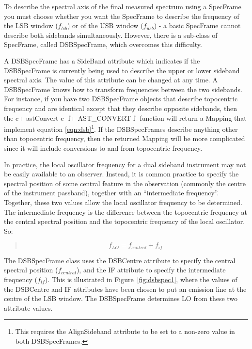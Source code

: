 \documentclass[twoside,11pt]{starlink}
\begin{document}
To describe the spectral axis of the final measured spectrum
using a SpecFrame you must choose whether you want the SpecFrame to
describe the frequency of the LSB window ($f_{lsb}$) or of the USB window
($f_{usb}$) - a basic SpecFrame cannot describe both sidebands
simultaneously. However, there is a sub-class of SpecFrame, called
DSBSpecFrame, which overcomes this difficulty.

A DSBSpecFrame has a SideBand attribute which indicates if the
DSBSpecFrame is currently being used to describe the upper or lower
sideband spectral axis. The value of this attribute can be changed at any
time. A DSBSpecFrame knows how to transform frequencies between the two
sidebands. For instance, if you have two DSBSpecFrame objects that
describe topocentric frequency and are identical except that they
describe opposite sidebands, then the
c+
astConvert
c-
f+
AST\_CONVERT
f-
function will return a Mapping that implement equation
\ref{eqn:dsb}\footnote{This requires the AlignSideband attribute to be
set to a non-zero value in both DSBSpecFrames.}. If the DSBSpecFrames
describe anything other than topocentric frequency, then the returned
Mapping will be more complicated since it will include conversions to and
from topocentric frequency.

In practice, the local oscillator frequency for a dual sideband
instrument may not be easily available to an observer. Instead, it is
common practice to specify the spectral position of some central feature
in the observation (commonly the centre of the instrument passband),
together with an ``intermediate frequency''. Together, these two values
allow the local oscillator frequency to be determined. The intermediate
frequency is the difference between the topocentric frequency at the
central spectral position and the topocentric frequency of the local
oscillator. So:

\begin{quote}
\begin{small}
\begin{equation}
\label{eqn:dsb2}
   f_{LO} = f_{central} + f_{if}
\end{equation}
\end{small}
\end{quote}

The DSBSpecFrame class uses the DSBCentre attribute to specify the
central spectral position ($f_{central}$), and the IF attribute to
specify the intermediate frequency ($f_{if}$). This is illustrated in
Figure~\ref{fig:dsbspec1}, where the values of the DSBCentre and IF
attributes have been chosen to put an emission line at the centre of the
LSB window. The DSBSpecFrame determines LO from these two attribute values.
\end{document}
